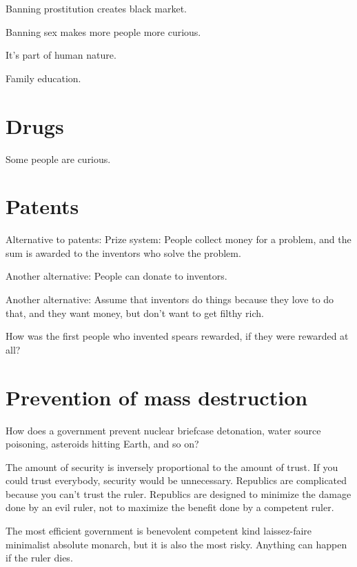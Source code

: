 Banning prostitution creates black market.

Banning sex makes more people more curious.

It's part of human nature.

Family education.

\section{Drugs}

Some people are curious.

\section{Patents}

Alternative to patents:
Prize system:
People collect money for a problem,
and the sum is awarded to the inventors who solve the problem.

Another alternative: People can donate to inventors.

Another alternative: Assume that inventors do things
because they love to do that, and they want money, but don't want to get filthy rich.

How was the first people who invented spears rewarded,
if they were rewarded at all?

\section{Prevention of mass destruction}

How does a government prevent
nuclear briefcase detonation,
water source poisoning,
asteroids hitting Earth,
and so on?

The amount of security is inversely proportional to the amount of trust.
If you could trust everybody, security would be unnecessary.
Republics are complicated because you can't trust the ruler.
Republics are designed to minimize the damage done by an evil ruler,
not to maximize the benefit done by a competent ruler.

The most efficient government is
benevolent competent kind laissez-faire minimalist absolute monarch,
but it is also the most risky.
Anything can happen if the ruler dies.
